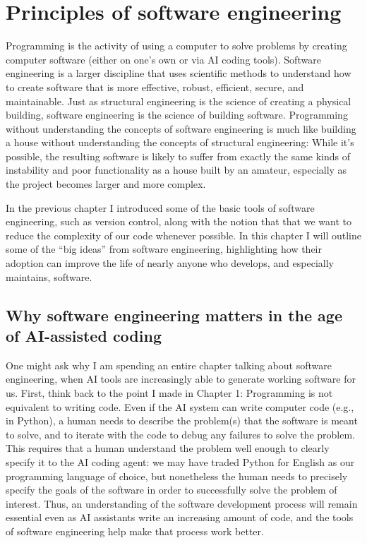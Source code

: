 \chapter{Principles of software engineering}

Programming is the activity of using a computer to solve problems by creating computer software (either on one's own or via AI coding tools).  
Software engineering is a larger discipline that uses scientific methods to understand how to create software that is more effective, robust, efficient, secure, and maintainable. 
Just as structural engineering is the science of creating a physical building, software engineering is the science of building software. 
Programming without understanding the concepts of software engineering is much like building a house without understanding the concepts of structural engineering: While it's possible, the resulting software is likely to suffer from exactly the same kinds of instability and poor functionality as a house built by an amateur, especially as the project becomes larger and more complex.

In the previous chapter I introduced some of the basic tools of software engineering, such as version control, along with the notion that that we want to reduce the complexity of our code whenever possible.  
In this chapter I will outline some of the ``big ideas'' from software engineering, highlighting how their adoption can improve the life of nearly anyone who develops, and especially maintains, software.

\section{Why software engineering matters in the age of AI-assisted coding}

One might ask why I am spending an entire chapter talking about software engineering, when AI tools are increasingly able to generate working software for us.
First, think back to the point I made in Chapter 1: Programming is not equivalent to writing code.
Even if the AI system can write computer code (e.g., in Python), a human needs to describe the problem(s) that the software is meant to solve, and to iterate with the code to debug any failures to solve the problem.
This requires that a human understand the problem well enough to clearly specify it to the AI coding agent: we may have traded Python for English as our programming language of choice, but nonetheless the human needs to precisely specify the goals of the software in order to successfully solve the problem of interest.
Thus, an understanding of the software development process will remain essential even as AI assistants write an increasing amount of code, and the tools of software engineering help make that process work better.

